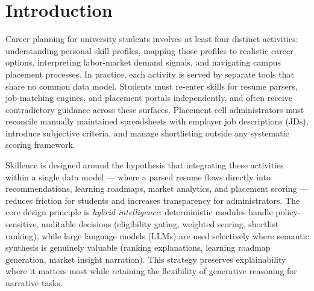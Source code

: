 \documentclass[conference]{IEEEtran}
\begin{document}
\section{Introduction}

Career planning for university students involves at least four distinct
activities: understanding personal skill profiles, mapping those
profiles to realistic career options, interpreting labor-market demand
signals, and navigating campus placement processes. In practice, each
activity is served by separate tools that share no common data model.
Students must re-enter skills for resume parsers, job-matching engines,
and placement portals independently, and often receive contradictory
guidance across these surfaces. Placement cell administrators must
reconcile manually maintained spreadsheets with employer job
descriptions (JDs), introduce subjective criteria, and manage
shortlisting outside any systematic scoring framework.

Skillence is designed around the hypothesis that integrating these
activities within a single data model --- where a parsed resume flows
directly into recommendations, learning roadmaps, market analytics, and
placement scoring --- reduces friction for students and increases
transparency for administrators. The core design principle is
\emph{hybrid intelligence}: deterministic modules handle
policy-sensitive, auditable decisions (eligibility gating, weighted
scoring, shortlist ranking), while large language models (LLMs) are
used selectively where semantic synthesis is genuinely valuable
(ranking explanations, learning roadmap generation, market insight
narration). This strategy preserves explainability where it matters
most while retaining the flexibility of generative reasoning for
narrative tasks.
\end{document}
